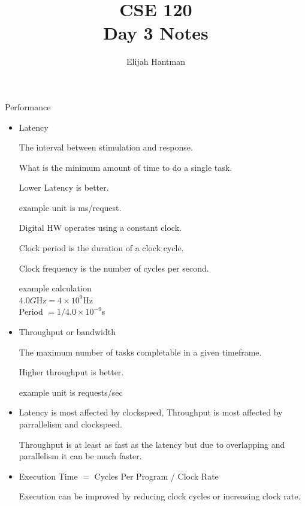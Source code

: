 \documentclass{report}
\title{\Huge{CSE 120}\\Day 3 Notes}
\author{\huge{Elijah Hantman}}
\date{}
\begin{document}
\maketitle
\newpage

{\large Performance}
\begin{mdframed}
    \begin{itemize}
        \item Latency

            The interval between stimulation and
            response.

            What is the minimum amount of time to do
            a single task.

            Lower Latency is better.

            example unit is ms/request.

            \begin{mdframed}
                Digital HW operates using a constant
                clock.

                Clock period is the duration of a clock cycle.

                Clock frequency is the number of cycles per second.

                example calculation\\
                $4.0G$Hz$ = 4\times 10^9 $Hz\\
                Period $= 1/4.0 \times 10^{-9}$s
            \end{mdframed}

        \item Throughput or bandwidth

            The maximum number of tasks completable in a given
            timeframe.

            Higher throughput is better.

            example unit is requests/sec

        \item Latency is most affected by clockspeed, Throughput
            is most affected by parrallelism and clockspeed.

            Throughput is at least as fast as the latency but
            due to overlapping and parallelism it can be much
            faster.

        \item Execution Time $=$ Cycles Per Program / Clock Rate

            Execution can be improved by reducing clock cycles
            or increasing clock rate.


\end{itemize}
\end{mdframed}
\end{document}

